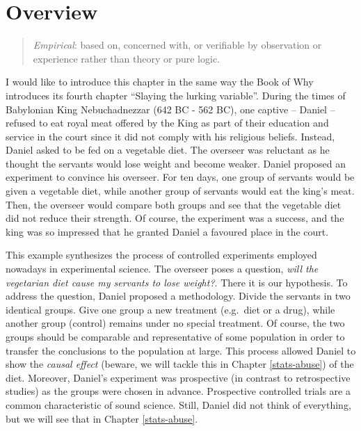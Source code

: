 \documentclass[
]{book}
\begin{document}
\hypertarget{overview-1}{%
\section{Overview}\label{overview-1}}

\begin{quote}
\emph{Empirical}: based on, concerned with, or verifiable by observation or experience rather than theory or pure logic.
\end{quote}

I would like to introduce this chapter in the same way the Book of Why \citep{book-of-why} introduces its fourth chapter ``Slaying the lurking variable''. During the times of Babylonian King Nebuchadnezzar (642 BC - 562 BC), one captive -- Daniel -- refused to eat royal meat offered by the King as part of their education and service in the court since it did not comply with his religious beliefs. Instead, Daniel asked to be fed on a vegetable diet. The overseer was reluctant as he thought the servants would lose weight and become weaker. Daniel proposed an experiment to convince his overseer. For ten days, one group of servants would be given a vegetable diet, while another group of servants would eat the king's meat. Then, the overseer would compare both groups and see that the vegetable diet did not reduce their strength. Of course, the experiment was a success, and the king was so impressed that he granted Daniel a favoured place in the court.

This example synthesizes the process of controlled experiments employed nowadays in experimental science. The overseer poses a question, \emph{will the vegetarian diet cause my servants to lose weight?}. There it is our hypothesis. To address the question, Daniel proposed a methodology. Divide the servants in two identical groups. Give one group a new treatment (e.g.~diet or a drug), while another group (control) remains under no special treatment. Of course, the two groups should be comparable and representative of some population in order to transfer the conclusions to the population at large. This process allowed Daniel to show the \emph{causal effect} (beware, we will tackle this in Chapter \ref{stats-abuse}) of the diet. Moreover, Daniel's experiment was prospective (in contrast to retrospective studies) as the groups were chosen in advance. Prospective controlled trials are a common characteristic of sound science. Still, Daniel did not think of everything, but we will see that in Chapter \ref{stats-abuse}.
\end{document}
